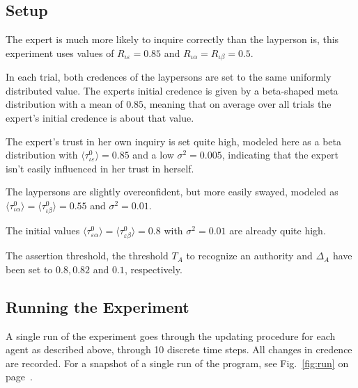 \documentclass[11pt, a4paper]{scrartcl}
\renewcommand{\a}{\alpha}
\begin{document}
\subsection{Setup}
The expert is much more likely to inquire correctly than the layperson is, this experiment uses values of $R_{\iota\varepsilon} = 0.85$ and $R_{\iota\a} = R_{\iota\beta} = 0.5$.

In each trial, both credences of the laypersons are set to the same uniformly distributed value. The experts initial credence is given by a beta-shaped meta distribution with a mean of $ 0.85$, meaning that on average over all trials the expert's initial credence is about that value.

The expert's trust in her own inquiry is set quite high, modeled here as a beta distribution with $\langle \tau^0_{\iota\varepsilon} \rangle = 0.85$ and a low $\sigma^2 = 0.005$, indicating that the expert isn't easily influenced in her trust in herself.

The laypersons are slightly overconfident, but more easily swayed, modeled as $\langle \tau^0_{\iota\a} \rangle =\langle \tau^0_{\iota\beta} \rangle = 0.55$ and $\sigma^2 = 0.01$.

The initial values $\langle \tau^0_{\varepsilon\a} \rangle =\langle \tau^0_{\varepsilon\beta} \rangle = 0.8$ with $\sigma^2 = 0.01$ are already quite high.

The assertion threshold, the threshold $T_A$ to recognize an authority and $\Delta_A$ have been set to $0.8, 0.82$ and $0.1$, respectively.

\subsection{Running the Experiment}

A single run of the experiment goes through the updating procedure for each agent as described above, through 10 discrete time steps. All changes in credence are recorded. For a snapshot of a single run of the program, see Fig.~\ref{fig:run} on page~\pageref{fig:run}.
\end{document}
